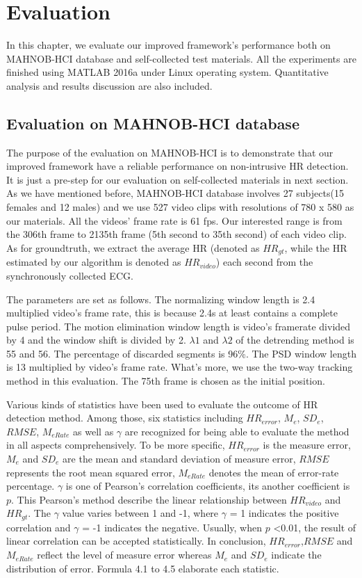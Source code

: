 \chapter{Evaluation}
In this chapter, we evaluate our improved framework's performance both on MAHNOB-HCI database and self-collected test materials. All the experiments are finished using MATLAB 2016a under Linux operating system. Quantitative analysis and results discussion are also included.

\section{Evaluation on MAHNOB-HCI database}
The purpose of the evaluation on MAHNOB-HCI is to demonstrate that our improved framework have a reliable performance on non-intrusive HR detection. It is just a pre-step for our evaluation on self-collected materials in next section. As we have mentioned before, MAHNOB-HCI database involves 27 subjects(15 females and 12 males) and we use 527 video clips with resolutions of 780 x 580 as our materials. All the videos' frame rate is 61 fps. Our interested range is from the 306th frame to 2135th frame (5th second to 35th second) of each video clip. As for groundtruth, we extract the average HR (denoted as $HR_{gt}$, while the HR estimated by our algorithm is denoted as $HR_{video}$) each second from the synchronously collected ECG.

The parameters are set as follows. The normalizing window length is 2.4 multiplied video's frame rate, this is because 2.4s at least contains a complete pulse period. The motion elimination window length is video's framerate divided by 4 and the window shift is divided by 2. $\lambda1$ and $\lambda2$ of the detrending method is 55 and 56. The percentage of discarded segments is 96\%. The PSD window length is 13 multiplied by video's frame rate. What's more, we use the two-way tracking method in this evaluation. The 75th frame is chosen as the initial position. 

Various kinds of statistics have been used to evaluate the outcome of HR detection method. Among those, six statistics including $HR_{error}$, $M_e$, $SD_e$, $RMSE$, $M_{eRate}$ as well as $\gamma$ are recognized for being able to evaluate the method in all aspects comprehensively\cite{li2014remote}. To be more specific, $HR_{error}$ is the measure error, $M_e$ and $SD_e$ are the mean and standard deviation of measure error, $RMSE$ represents the root mean squared error, $M_{eRate}$ denotes the mean of error-rate percentage. $\gamma$ is one of Pearson's correlation coefficients, its another coefficient is $p$. This Pearson's method describe the linear relationship between $HR_{video}$ and $HR_{gt}$. The $\gamma$ value varies between 1 and -1, where $\gamma$ = 1 indicates the positive correlation and $\gamma$ = -1 indicates the negative. Usually, when $p$ <0.01, the result of linear correlation can be accepted statistically. In conclusion, $HR_{error}$,$RMSE$ and $M_{eRate}$ reflect the level of measure error whereas $M_e$ and $SD_e$ indicate the distribution of error. Formula 4.1 to 4.5 elaborate each statistic.
     
